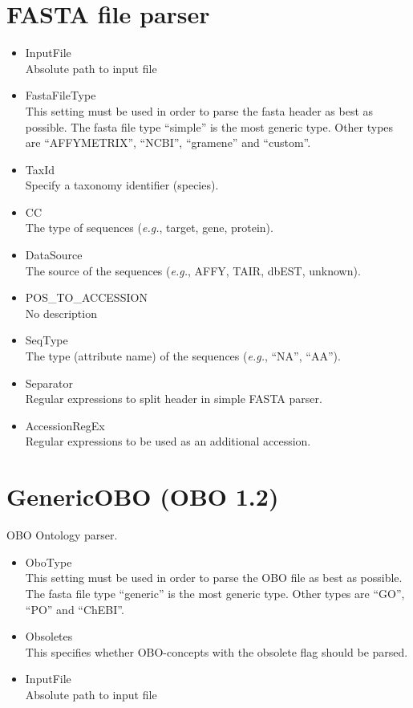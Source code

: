 \section{FASTA file parser}
\begin{itemize}
  \item{InputFile}\\
  Absolute path to input file
  \item{FastaFileType}\\
  This setting must be used in order to parse the fasta header as best as possible.
  The fasta file type ``simple'' is the most generic type.
  Other types are ``AFFYMETRIX'', ``NCBI'', ``gramene'' and ``custom''.
  \item{TaxId}\\
  Specify a taxonomy identifier (species).
  \item{CC}\\
  The type of sequences ({\it{e.g.}}, target, gene, protein).
  \item{DataSource}\\
  The source of the sequences ({\it{e.g.}}, AFFY, TAIR, dbEST, unknown).
  \item{POS\_TO\_ACCESSION}\\
  No description
  \item{SeqType}\\
  The type (attribute name) of the sequences ({\it{e.g.}}, ``NA'', ``AA'').
  \item{Separator}\\
  Regular expressions to split header in simple FASTA parser.
  \item{AccessionRegEx}\\
  Regular expressions to be used as an additional accession.
\end{itemize}
    
    
\section{GenericOBO (OBO 1.2)}
OBO Ontology parser.
\begin{itemize}
  \item{OboType}\\
  This setting must be used in order to parse the OBO file as best as possible.
  The fasta file type ``generic'' is the most generic type.
  Other types are ``GO'', ``PO'' and ``ChEBI''.
  \item{Obsoletes}\\
  This specifies whether OBO-concepts with the obsolete flag should be parsed.
  \item{InputFile}\\
  Absolute path to input file
\end{itemize}
    
